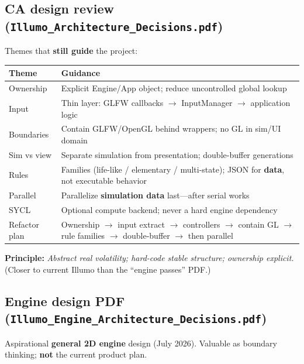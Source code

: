\documentclass[10pt,a4paper]{article}
\begin{document}
\subsection{CA design review (\texttt{Illumo\_Architecture\_Decisions.pdf})}
Themes that \textbf{still guide} the project:
\begin{table}[h!]
\centering
\small
\begin{tabularx}{\textwidth}{l X}
\toprule
\textbf{Theme} & \textbf{Guidance} \\
\midrule
Ownership & Explicit Engine/App object; reduce uncontrolled global lookup \\
Input & Thin layer: GLFW callbacks $\rightarrow$ InputManager $\rightarrow$ application logic \\
Boundaries & Contain GLFW/OpenGL behind wrappers; no GL in sim/UI domain \\
Sim vs view & Separate simulation from presentation; double-buffer generations \\
Rules & Families (life-like / elementary / multi-state); JSON for \textbf{data}, not executable behavior \\
Parallel & Parallelize \textbf{simulation data} last---after serial works \\
SYCL & Optional compute backend; never a hard engine dependency \\
Refactor plan & Ownership $\rightarrow$ input extract $\rightarrow$ controllers $\rightarrow$ contain GL $\rightarrow$ rule families $\rightarrow$ double-buffer $\rightarrow$ then parallel \\
\bottomrule
\end{tabularx}
\end{table}

\noindent \textbf{Principle:} \textit{Abstract real volatility; hard-code stable structure; ownership explicit.} \quad (Closer to current Illumo than the ``engine passes'' PDF.)

\subsection{Engine design PDF (\texttt{Illumo\_Engine\_Architecture\_Decisions.pdf})}
Aspirational \textbf{general 2D engine} design (July 2026). Valuable as boundary thinking; \textbf{not} the current product plan.
\end{document}

